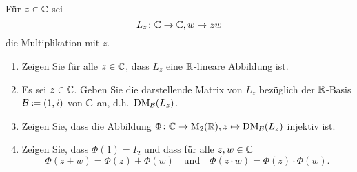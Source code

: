 \begin{question}
 Für $z \in \mathbb{C}$ sei
 \[
  L_z \colon \mathbb{C} \to \mathbb{C}, w \mapsto z w
 \]
 die Multiplikation mit $z$.
 \begin{enumerate}
  \item
   Zeigen Sie für alle $z \in \mathbb{C}$, dass $L_z$ eine $\mathbb{R}$-lineare Abbildung ist.
  \item
   Es sei $z \in \mathbb{C}$. Geben Sie die darstellende Matrix von $L_z$ bezüglich der $\mathbb{R}$-Basis $\mathcal{B} \coloneqq (1,i)$ von $\mathbb{C}$ an, d.h.\ $\operatorname{DM}_{\mathcal{B}}(L_z)$.
  \item
   Zeigen Sie, dass die Abbildung $\Phi \colon \mathbb{C} \to \operatorname{M}_2(\mathbb{R}), z \mapsto \operatorname{DM}_{\mathcal{B}}(L_z)$ injektiv ist.
  \item
   Zeigen Sie, dass $\Phi(1) = I_2$ und dass für alle $z, w \in \mathbb{C}$
   \[
    \Phi(z+w) = \Phi(z) + \Phi(w)
    \quad \text{und} \quad
    \Phi(z \cdot w) = \Phi(z) \cdot \Phi(w).
   \]
 \end{enumerate}
\end{question}
